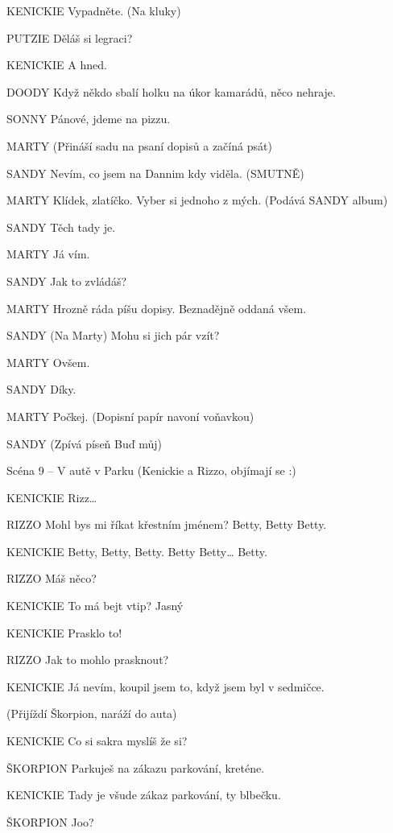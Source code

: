 KENICKIE        Vypadněte. (Na kluky)

PUTZIE        Děláš si legraci?

KENICKIE        A hned.

DOODY        Když někdo sbalí holku na úkor kamarádů, něco nehraje. 

SONNY        Pánové, jdeme na pizzu.

        

MARTY        (Přináší sadu na psaní dopisů a začíná psát)

SANDY        Nevím, co jsem na Dannim kdy viděla. (SMUTNĚ)

MARTY        Klídek, zlatíčko. Vyber si jednoho z mých. (Podává SANDY album)

SANDY        Těch tady je. 

MARTY        Já vím.

SANDY        Jak to zvládáš?

MARTY        Hrozně ráda píšu dopisy. Beznadějně oddaná všem.

SANDY        (Na Marty) Mohu si jich pár vzít?

MARTY        Ovšem.

SANDY        Díky.

MARTY        Počkej. (Dopisní papír navoní voňavkou)

SANDY        (Zpívá píseň Buď můj)

Scéna 9 – V autě v Parku (Kenickie a Rizzo, objímají se :)

KENICKIE        Rizz…

RIZZO        Mohl bys mi říkat křestním jménem? Betty, Betty Betty.

KENICKIE        Betty, Betty, Betty. Betty Betty… Betty.

RIZZO        Máš něco?

KENICKIE        To má bejt vtip? Jasný

KENICKIE        Prasklo to!

RIZZO        Jak to mohlo prasknout?

KENICKIE        Já nevím, koupil jsem to, když jsem byl v sedmičce.

(Přijíždí Škorpion, naráží do auta)

KENICKIE        Co si sakra myslíš že si?

ŠKORPION        Parkuješ na zákazu parkování, kreténe.

KENICKIE        Tady je všude zákaz parkování, ty blbečku.

ŠKORPION        Joo?

